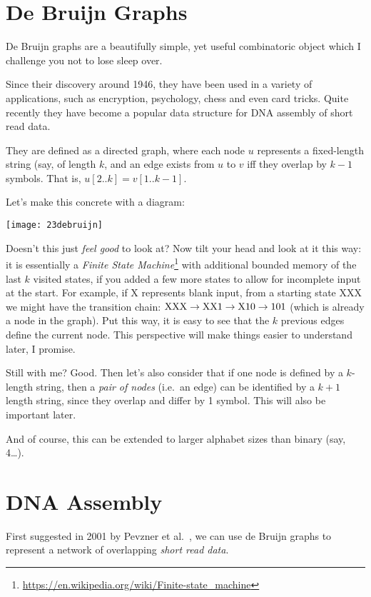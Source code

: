 \section{De Bruijn Graphs}\label{bl-sec:dbg}

De Bruijn graphs are a beautifully simple, yet useful combinatoric object which I challenge you not to lose sleep over.

Since their discovery around 1946, they have been used in a variety of applications, such as encryption, psychology, chess and even card tricks. Quite recently they have become a popular data structure for DNA assembly of short read data.

They are defined as a directed graph, where each node $u$ represents a fixed-length string (say, of length $k$, and an edge exists from $u$ to $v$ iff they overlap by $k-1$ symbols. That is, $u[2..k]=v[1..k-1]$.

Let's make this concrete with a diagram:

\medskip\centerline{\texttt{[image: 23debruijn]}}\medskip

Doesn't this just \emph{feel good} to look at? Now tilt your head and look at it this way: it is essentially a \emph{Finite State Machine}\footnote{\url{https://en.wikipedia.org/wiki/Finite-state_machine}} with additional bounded memory of the last $k$ visited states, if you added a few more states to allow for incomplete input at the start. For example, if X represents blank input, from a starting state XXX we might have the transition chain: $\rm XXX \to XX1 \to X10 \to 101$ (which is already a node in the graph). Put this way, it is easy to see that the $k$ previous edges define the current node. This perspective will make things easier to understand later, I promise.

Still with me? Good. Then let's also consider that if one node is defined by a $k$-length string, then a \emph{pair of nodes} (i.e.\ an edge) can be identified by a $k+1$ length string, since they overlap and differ by 1 symbol. This will also be important later.

And of course, this can be extended to larger alphabet sizes than binary (say, 4\ldots).

\section{DNA Assembly}\label{bl-sec:dna}

First suggested in 2001 by Pevzner et al.~\cite{PTW}, we can use de Bruijn graphs to represent a network of overlapping \emph{short read data}.

